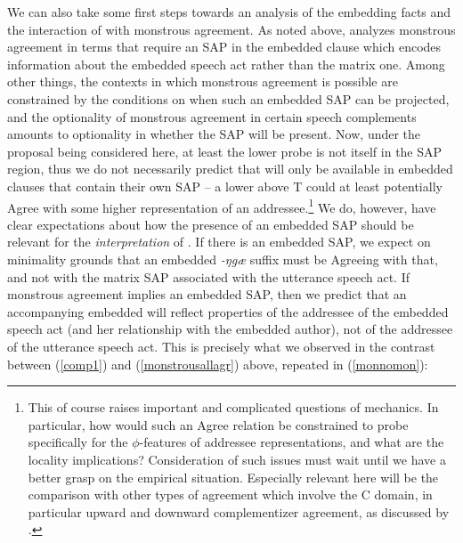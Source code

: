 \documentclass[output=paper, modfonts, nonflat]{langsci/langscibook}
\begin{document}
We can also take some first steps towards an analysis of the embedding
facts and the interaction of \allagr{} with monstrous agreement. As
noted above, \citet{sundaresan:diss} analyzes monstrous agreement in
terms that require an SAP in the embedded clause which encodes
information about the embedded speech act rather than the matrix
one. Among other things, the contexts in which monstrous agreement is
possible are constrained by the conditions on when such an embedded
SAP can be projected, and the optionality of monstrous agreement in
certain speech complements amounts to optionality in whether the SAP
will be present. Now, under the proposal being considered here, at
least the lower \allagr{} probe is not itself in the SAP region, thus
we do not necessarily predict that \allagr{} will only be available in
embedded clauses that contain their own SAP -- a lower \allagr{}
above T could at least potentially Agree with some higher
representation of an addressee.\footnote{This of course raises
  important and complicated questions of mechanics. In particular, how
  would such an Agree relation be constrained to probe specifically
  for the $\phi$-features of addressee representations, and what are
  the locality implications? Consideration of such issues must wait
  until we have a better grasp on the empirical situation. Especially relevant here will be the comparison with other types of agreement which involve the C domain, in particular upward and downward complementizer agreement, as discussed by .} We do,
however, have clear expectations about how the presence of an embedded
SAP should be relevant for the \emph{interpretation} of \allagr. If
there is an embedded SAP, we expect on minimality grounds that an
embedded \textit{-ŋgæ} suffix must be Agreeing with that, and not
with the matrix SAP associated with the utterance speech act. If
monstrous agreement implies an embedded SAP, then we predict that an
accompanying embedded \allagr{} will reflect properties of the
addressee of the embedded speech act (and her relationship with the
embedded author), not of the addressee of the utterance speech
act. This is precisely what we observed in the contrast between
(\ref{comp1}) and (\ref{monstrousallagr}) above, repeated in
(\ref{monnomon}):
\end{document}
